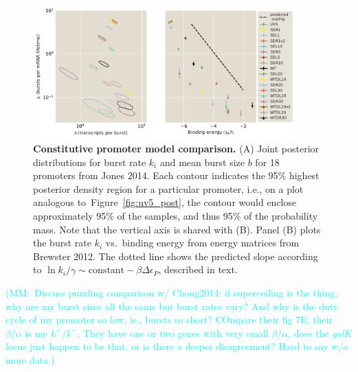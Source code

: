 \documentclass[12pt]{article}%
\newcommand{\mmnote}[1]{\textcolor{cyan}{(MM:~#1)}}
\newcommand{\fig}[1]{Figure~\ref{#1}}
\begin{document}
\begin{figure}%
\centering
\includegraphics[width=0.9\textwidth]{../figures/fig2/fig2pt2.pdf}
\caption{\textbf{Constitutive promoter model comparison.}
    (A) Joint posterior distributions for burst rate $k_i$ and
    mean burst size $b$ for 18 promoters from Jones 2014.
    Each contour indicates the 95\% highest posterior density
    region for a particular promoter, i.e., on a plot analogous
    to~\fig{fig:uv5_post}, the contour would enclose
    approximately 95\% of the samples, and thus 95\% of the
    probability mass.
    Note that the vertical axis is shared with (B).
    Panel (B) plots the burst rate $k_i$ vs.\ binding energy from energy
    matrices from Brewster 2012.
    The dotted line shows the predicted slope according to
    $\ln k_i/\gamma \sim \text{constant} - \beta\Delta\epsilon_P$,
    described in text.
    }
\label{fig:constit_post}
\end{figure}
\mmnote{Discuss puzzling comparison w/ Chong2014: if supercoiling is the thing, why are my burst sizes all the same but burst rates vary? And why is the duty cycle of my promoter so low, ie., bursts so short? COmpare their fig 7E; their $\beta/\alpha$ is my $k^+/k^-$. They have one or two genes with very small $\beta/\alpha$, does the \textit{galK} locus just happen to be that, or is there a deeper disagreement? Hard to say w/o more data.}
\end{document}
